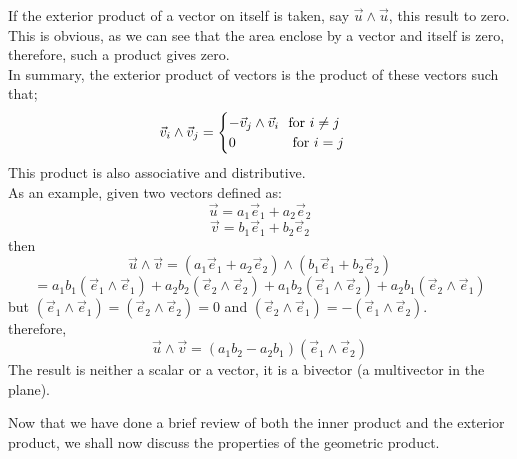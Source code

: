 \documentclass[12pt,onecolumn,letterpaper]{article} %
\begin{document}
\begin{enumerate}
\begin{figure}[h]
\end{figure}
If the exterior product of a vector on itself is taken, say $\vec{u}\wedge\vec{u}$, this result to zero. This is obvious, as we can see that the area enclose by a vector and itself is zero, therefore, such a product gives zero.\\
In summary, the exterior product of vectors is the product of these vectors such that;
\begin{equation*}
  \vec{v}_i\wedge\vec{v}_j= \begin{cases} 
      -\vec{v}_j\wedge\vec{v}_i\ {\mbox{ for }} i\neq j \\
      0\ \hspace{1.2cm}{\mbox{ for }} i = j
   \end{cases}\label{wedgee} 
\end{equation*}
This product is also associative and distributive.\\
As an example, given two vectors defined as:
$$\vec{u}=a_1\vec{e}_1+a_2\vec{e}_2$$
$$\vec{v}=b_1\vec{e}_1+b_2\vec{e}_2$$
then 
$$\vec{u}\wedge\vec{v}=(a_1\vec{e}_1+a_2\vec{e}_2)\wedge(b_1\vec{e}_1+b_2\vec{e}_2)$$
$$=a_1b_1(\vec{e}_1\wedge\vec{e}_1)+a_2b_2(\vec{e}_2\wedge\vec{e}_2)+a_1b_2(\vec{e}_1\wedge\vec{e}_2)+a_2b_1(\vec{e}_2\wedge\vec{e}_1)$$
but $(\vec{e}_1\wedge\vec{e}_1)=(\vec{e}_2\wedge\vec{e}_2)=0$ and  $(\vec{e}_2\wedge\vec{e}_1)=-(\vec{e}_1\wedge\vec{e}_2)$.\\
therefore,
$$\vec{u}\wedge\vec{v}=(a_1b_2-a_2b_1)(\vec{e}_1\wedge\vec{e}_2)$$
The result is neither a scalar or a vector, it is a bivector (a multivector in the plane).
\end{enumerate}
Now that we have done a brief review of both the inner product and the exterior product, we shall now discuss the properties of the geometric product.
\end{document}
